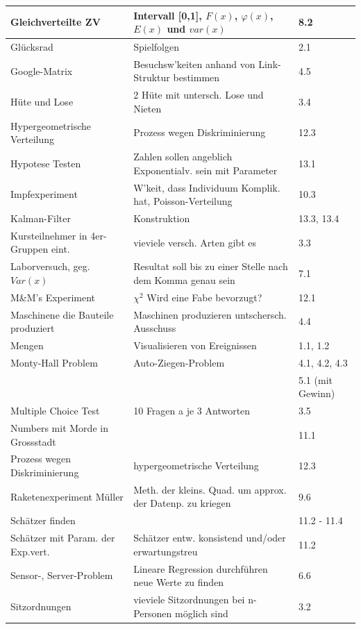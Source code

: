 \begin{center}
\begin{tabular}{|l|l|l|}
Gleichverteilte ZV & Intervall [0,1], $F(x)$, $\varphi(x)$, $E(x) $ und $var(x)$ & 8.2 \\ \hline
Glücksrad & Spielfolgen & 2.1 \\ \hline
Google-Matrix & Besuchsw'keiten anhand von Link-Struktur bestimmen & 4.5 \\ \hline
Hüte und Lose & 2 Hüte mit untersch. Lose und Nieten & 3.4 \\ \hline
Hypergeometrische Verteilung & Prozess wegen Diskriminierung & 12.3 \\ \hline
Hypotese Testen & Zahlen sollen angeblich Exponentialv. sein mit Parameter & 13.1 \\ \hline
Impfexperiment & W'keit, dass Individuum Komplik. hat, Poisson-Verteilung & 10.3 \\ \hline
Kalman-Filter & Konstruktion & 13.3, 13.4 \\ \hline
Kursteilnehmer in 4er-Gruppen eint. & vieviele versch. Arten gibt es & 3.3 \\ \hline
Laborversuch, geg. $Var(x)$ & Resultat soll bis zu einer Stelle nach dem Komma genau sein & 7.1 \\ \hline
M\&M's Experiment & $\chi^2$  Wird eine Fabe bevorzugt?  & 12.1 \\ \hline
Maschinene die Bauteile produziert & Maschinen produzieren untschersch. Ausschuss & 4.4 \\ \hline
Mengen & Visualisieren von Ereignissen & 1.1, 1.2 \\ \hline
Monty-Hall Problem & Auto-Ziegen-Problem & 4.1, 4.2, 4.3 \\ & & 5.1 (mit Gewinn) \\ \hline
Multiple Choice Test & 10 Fragen a je 3 Antworten & 3.5 \\ \hline
Numbers mit Morde in Grossstadt & & 11.1 \\ \hline
Prozess wegen Diskriminierung & hypergeometrische Verteilung & 12.3 \\ \hline
Raketenexperiment Müller & Meth. der kleins. Quad. um approx. der Datenp. zu kriegen & 9.6 \\ \hline
Schätzer finden & & 11.2 - 11.4 \\ \hline
Schätzer mit Param. der Exp.vert. & Schätzer entw. konsistend und/oder erwartungstreu & 11.2 \\ \hline
Sensor-, Server-Problem & Lineare Regression durchführen neue Werte zu finden & 6.6 \\ \hline
Sitzordnungen & vieviele Sitzordnungen bei n-Personen möglich sind & 3.2 \\ \hline

\end{tabular}
\end{center}

